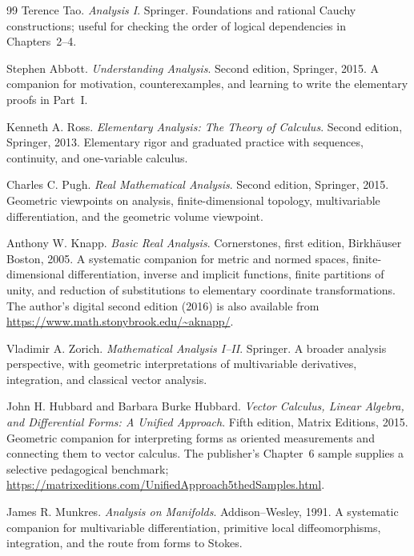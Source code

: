 \begin{thebibliography}{99}
Terence Tao. \emph{Analysis I}. Springer.
\newblock Foundations and rational Cauchy constructions; useful for checking
the order of logical dependencies in Chapters~2--4.

Stephen Abbott. \emph{Understanding Analysis}. Second edition, Springer, 2015.
\newblock A companion for motivation, counterexamples, and learning to write
the elementary proofs in Part~I.

Kenneth A. Ross. \emph{Elementary Analysis: The Theory of Calculus}.
Second edition, Springer, 2013.
\newblock Elementary rigor and graduated practice with sequences, continuity,
and one-variable calculus.

Charles C. Pugh. \emph{Real Mathematical Analysis}. Second edition,
Springer, 2015.
\newblock Geometric viewpoints on analysis, finite-dimensional topology,
multivariable differentiation, and the geometric volume viewpoint.

Anthony W. Knapp. \emph{Basic Real Analysis}. Cornerstones, first edition,
Birkh\"auser Boston, 2005.
\newblock A systematic companion for metric and normed spaces,
finite-dimensional differentiation, inverse and implicit functions,
finite partitions of unity, and reduction of substitutions to elementary
coordinate transformations. The author's digital second edition (2016)
is also available from \url{https://www.math.stonybrook.edu/~aknapp/}.

Vladimir A. Zorich. \emph{Mathematical Analysis I--II}. Springer.
\newblock A broader analysis perspective, with geometric interpretations of
multivariable derivatives, integration, and classical vector analysis.

John H. Hubbard and Barbara Burke Hubbard.
\emph{Vector Calculus, Linear Algebra, and Differential Forms:
A Unified Approach}. Fifth edition, Matrix Editions, 2015.
\newblock Geometric companion for interpreting forms as oriented
measurements and connecting them to vector calculus. The publisher's
Chapter~6 sample supplies a selective pedagogical benchmark;
\url{https://matrixeditions.com/UnifiedApproach5thedSamples.html}.

James R. Munkres. \emph{Analysis on Manifolds}. Addison--Wesley, 1991.
\newblock A systematic companion for multivariable differentiation,
primitive local diffeomorphisms, integration, and the route from forms to Stokes.


\end{thebibliography}
